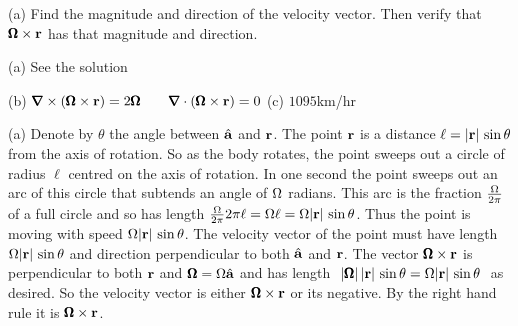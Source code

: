 \begin{hint} 
(a) Find the magnitude and direction of the velocity vector.
Then verify that $\pmb{\Omega}\times\mathbf{r}$ has that magnitude and direction.
\end{hint}

\begin{answer} 
(a) See the solution

(b) $\vnabla\times(\vOm\times\vr)=2\vOm\qquad \vnabla\cdot(\vOm\times\vr)=0$
\qquad
(c) $1095$km/hr

\end{answer}

\begin{solution} 
(a)
 Denote by $\theta$ the angle between $\hat{\mathbf{a}}$ and $\mathbf{r}$.
The point $\mathbf{r}$ is a distance $\ell=|\mathbf{r}|\,\sin\theta$ from the axis
of rotation. So as the body rotates, the point sweeps out a circle of radius
$\ell$ centred on the axis of rotation.
%
In one second the point sweeps
out an arc of this circle that subtends an angle of $\Omega$ radians. This arc
is the fraction $\frac{\Omega}{2\pi}$ of a full circle and so has length
$\frac{\Omega}{2\pi}2\pi \ell=\Omega\ell=\Omega|\mathbf{r}|\,\sin\theta$. Thus the point
is moving with speed $\Omega|\mathbf{r}|\,\sin\theta$. The velocity vector of the
point must have length $\Omega|\mathbf{r}|\,\sin\theta$ and direction perpendicular
to both $\hat{\mathbf{a}}$ and $\mathbf{r}$. The vector 
$\pmb{\Omega}\times\mathbf{r}$ is perpendicular to both  $\mathbf{r}$ and $\pmb{\Omega}=\Omega\hat{\mathbf{a}}$
and has length
$\ 
|\vOm|\,|\vr|\,\sin\theta
=\Om|\vr|\,\sin\theta
\ $
as desired. So the velocity vector is either
$\pmb{\Omega}\times\mathbf{r}$ or its negative. By the right hand rule it is $\pmb{\Omega}\times\mathbf{r}$.
\smallskip


\end{solution}
